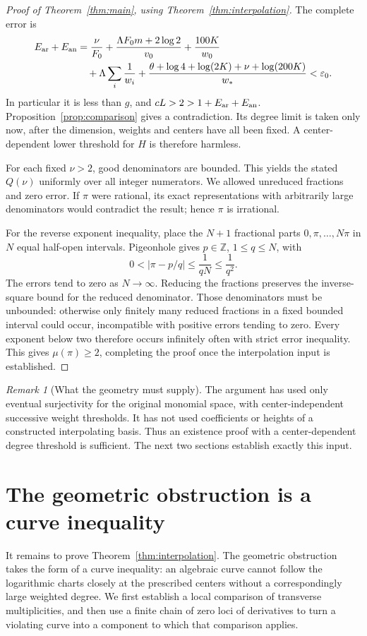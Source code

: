 \documentclass[11pt]{article}
\theoremstyle{definition}
\theoremstyle{remark}
\newtheorem{remark}[theorem]{Remark}
\newcommand{\Z}{\mathbb Z}
\numberwithin{equation}{section}
\begin{document}
\begin{proof}[Proof of Theorem~\ref{thm:main}, using Theorem~\ref{thm:interpolation}]
The complete error is
\begin{align*}
 E_{\rm ar}+E_{\rm an}
 &=\frac\nu{F_0}
 +\frac{\Lambda F_0m+2\log2}{v_0}+\frac{100K}{w_0}\\
 &\quad+\Lambda\sum_i\frac1{w_i}
 +\frac{\theta+\log4+\log(2K)+\nu+\log(200K)}{w_*}
 <\varepsilon_0.
\end{align*}
In particular it is less than \(g\), and
\(cL>2>1+E_{\rm ar}+E_{\rm an}\).
Proposition~\ref{prop:comparison} gives a contradiction. Its degree
limit is taken only now, after the dimension, weights and centers have
all been fixed. A center-dependent lower threshold for \(H\) is
therefore harmless.

For each fixed \(\nu>2\), good denominators are bounded. This yields
the stated \(Q(\nu)\) uniformly over all integer numerators.
We allowed unreduced fractions and zero error. If \(\pi\) were
rational, its exact representations with arbitrarily large denominators
would contradict the result; hence \(\pi\) is irrational.

For the reverse exponent inequality, place the \(N+1\) fractional
parts \(0,\pi,\ldots,N\pi\) in \(N\) equal half-open intervals.
Pigeonhole gives \(p\in\Z\), \(1\le q\le N\), with
\[
 0<|\pi-p/q|\le\frac1{qN}\le\frac1{q^2}.
\]
The errors tend to zero as \(N\to\infty\). Reducing the fractions
preserves the inverse-square bound for the reduced denominator.
Those denominators must be unbounded: otherwise only finitely many
reduced fractions in a fixed bounded interval could occur, incompatible
with positive errors tending to zero. Every exponent below two
therefore occurs infinitely often with strict error inequality. This
gives \(\mu(\pi)\ge2\), completing the proof once the interpolation
input is established.
\end{proof}

\begin{remark}[What the geometry must supply]
The argument has used only eventual surjectivity for the original
monomial space, with center-independent successive weight thresholds.
It has not used coefficients or heights of a constructed interpolating
basis. Thus an existence proof with a center-dependent degree threshold
is sufficient. The next two sections establish exactly this input.
\end{remark}
\section{The geometric obstruction is a curve inequality}\label{sec:curve}
It remains to prove Theorem~\ref{thm:interpolation}. The geometric
obstruction takes the form of a curve inequality: an algebraic curve
cannot follow the logarithmic charts closely at the prescribed centers
without a correspondingly large weighted degree. We first establish a
local comparison of transverse multiplicities, and then use a finite
chain of zero loci of derivatives to turn a violating curve into a
component to which that comparison applies.
\end{document}
